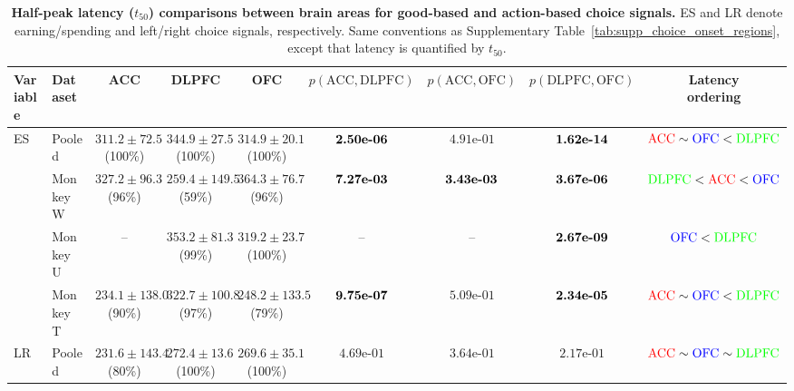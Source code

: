 \documentclass[pdflatex,sn-mathphys-num]{sn-jnl}%
\newcommand{\ACCc}{\textcolor{regionACC}{\mathrm{ACC}}}
\newcommand{\DLPFCc}{\textcolor{regionDLPFC}{\mathrm{DLPFC}}}
\newcommand{\OFCc}{\textcolor{regionOFC}{\mathrm{OFC}}}
\begin{document}
\begin{table}[p]
\vspace{4mm}
\caption{\textbf{Half-peak latency ($t_{50}$) comparisons between brain areas for good-based and action-based choice signals.} ES and LR denote earning/spending and left/right choice signals, respectively. Same conventions as Supplementary Table~\ref{tab:supp_choice_onset_regions}, except that latency is quantified by $t_{50}$.}
\label{tab:supp_choice_t50_regions}
\begingroup\fontsize{6.5}{8}\selectfont\setlength{\tabcolsep}{1pt}
\begin{tabular*}{\textwidth}{@{\extracolsep{\fill}}llccccccc@{}}\toprule
Variable & Dataset & ACC & DLPFC & OFC & $p(\mathrm{ACC},\mathrm{DLPFC})$ & $p(\mathrm{ACC},\mathrm{OFC})$ & $p(\mathrm{DLPFC},\mathrm{OFC})$ & \shortstack{Latency\\ordering}\\\midrule
ES & Pooled & \shortstack[c]{$311.2\pm72.5$\\(100\%)} & \shortstack[c]{$344.9\pm27.5$\\(100\%)} & \shortstack[c]{$314.9\pm20.1$\\(100\%)} & $\text{\bfseries \mbox{2.50e-06}}$ & $\mbox{4.91e-01}$ & $\text{\bfseries \mbox{1.62e-14}}$ & $\ACCc \sim \OFCc < \DLPFCc$ \\
  & Monkey W & \shortstack[c]{$327.2\pm96.3$\\(96\%)} & \shortstack[c]{$259.4\pm149.5$\\(59\%)} & \shortstack[c]{$364.3\pm76.7$\\(96\%)} & $\text{\bfseries \mbox{7.27e-03}}$ & $\text{\bfseries \mbox{3.43e-03}}$ & $\text{\bfseries \mbox{3.67e-06}}$ & $\DLPFCc < \ACCc < \OFCc$ \\
  & Monkey U & -- & \shortstack[c]{$353.2\pm81.3$\\(99\%)} & \shortstack[c]{$319.2\pm23.7$\\(100\%)} & -- & -- & $\text{\bfseries \mbox{2.67e-09}}$ & $\OFCc < \DLPFCc$ \\
  & Monkey T & \shortstack[c]{$234.1\pm138.0$\\(90\%)} & \shortstack[c]{$322.7\pm100.8$\\(97\%)} & \shortstack[c]{$248.2\pm133.5$\\(79\%)} & $\text{\bfseries \mbox{9.75e-07}}$ & $\mbox{5.09e-01}$ & $\text{\bfseries \mbox{2.34e-05}}$ & $\ACCc \sim \OFCc < \DLPFCc$ \\
\midrule
LR & Pooled & \shortstack[c]{$231.6\pm143.4$\\(80\%)} & \shortstack[c]{$272.4\pm13.6$\\(100\%)} & \shortstack[c]{$269.6\pm35.1$\\(100\%)} & $\mbox{4.69e-01}$ & $\mbox{3.64e-01}$ & $\mbox{2.17e-01}$ & $\ACCc \sim \OFCc \sim \DLPFCc$ \\

\end{tabular*}
\end{table}
\end{document}
